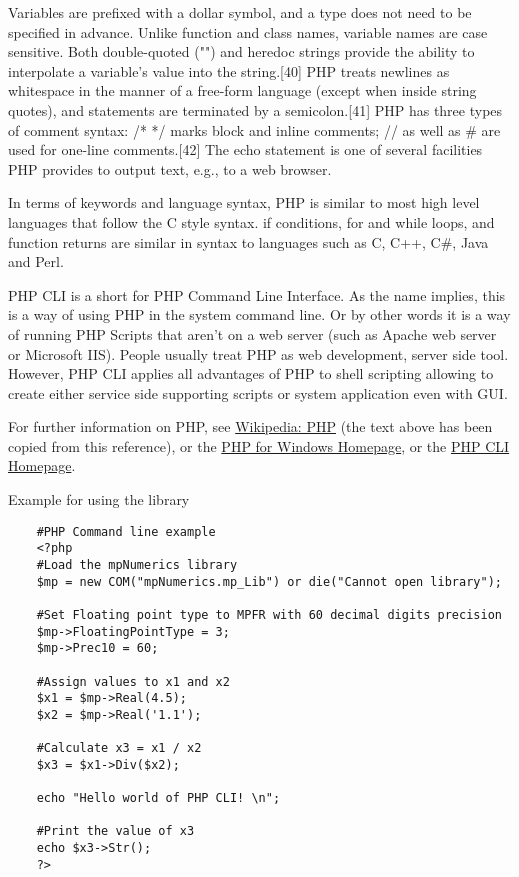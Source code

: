 	\vpara
	Variables are prefixed with a dollar symbol, and a type does not need to be specified in advance. Unlike function and class names, variable names are case sensitive. Both double-quoted ("") and heredoc strings provide the ability to interpolate a variable's value into the string.[40] PHP treats newlines as whitespace in the manner of a free-form language (except when inside string quotes), and statements are terminated by a semicolon.[41] PHP has three types of comment syntax: /* */ marks block and inline comments; // as well as \# are used for one-line comments.[42] The echo statement is one of several facilities PHP provides to output text, e.g., to a web browser.
	
	\vpara
	In terms of keywords and language syntax, PHP is similar to most high level languages that follow the C style syntax. if conditions, for and while loops, and function returns are similar in syntax to languages such as C, C++, C\#, Java and Perl.
	
	\vpara
	PHP CLI is a short for PHP Command Line Interface. As the name implies, this is a way of using PHP in the system command line. Or by other words it is a way of running PHP Scripts that aren't on a web server (such as Apache web server or Microsoft IIS). People usually treat PHP as web development, server side tool. However, PHP CLI applies all advantages of PHP to shell scripting allowing to create either service side supporting scripts or system application even with GUI.
	
	\vpara
	For further information on PHP, see \href{http://en.wikipedia.org/wiki/PHP}{Wikipedia: PHP} (the text above has been copied from this reference), or the  \href{http://windows.php.net/}{PHP for Windows Homepage}, or the  \href{http://www.php-cli.com/}{PHP CLI Homepage}.
	
	\vpara
	Example for using the library
	
	\begin{lstlisting}
	#PHP Command line example
	<?php
	#Load the mpNumerics library
	$mp = new COM("mpNumerics.mp_Lib") or die("Cannot open library");
	
	#Set Floating point type to MPFR with 60 decimal digits precision
	$mp->FloatingPointType = 3;
	$mp->Prec10 = 60;
	
	#Assign values to x1 and x2
	$x1 = $mp->Real(4.5);
	$x2 = $mp->Real('1.1');
	
	#Calculate x3 = x1 / x2
	$x3 = $x1->Div($x2);
	
	echo "Hello world of PHP CLI! \n";
	
	#Print the value of x3
	echo $x3->Str();
	?>
	\end{lstlisting}
	
